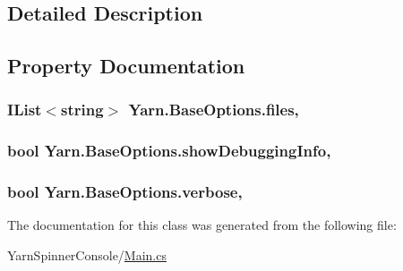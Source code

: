 \subsection{Detailed Description}


\subsection{Property Documentation}
\hypertarget{a00022_aa93cbb1bc1d5328e0a417012621e92d2}{
\subsubsection[{files}]{\setlength{\rightskip}{0pt plus 5cm}I\-List$<$string$>$ Yarn.\-Base\-Options.\-files\hspace{0.3cm}{\ttfamily [get]}, {\ttfamily [set]}}}\label{a00022_aa93cbb1bc1d5328e0a417012621e92d2}
\hypertarget{a00022_a89964ea17bd19caf00cb5bff563ed01c}{
\subsubsection[{show\-Debugging\-Info}]{\setlength{\rightskip}{0pt plus 5cm}bool Yarn.\-Base\-Options.\-show\-Debugging\-Info\hspace{0.3cm}{\ttfamily [get]}, {\ttfamily [set]}}}\label{a00022_a89964ea17bd19caf00cb5bff563ed01c}
\hypertarget{a00022_ada4d83d1756918f362d55f6649b82b17}{
\subsubsection[{verbose}]{\setlength{\rightskip}{0pt plus 5cm}bool Yarn.\-Base\-Options.\-verbose\hspace{0.3cm}{\ttfamily [get]}, {\ttfamily [set]}}}\label{a00022_ada4d83d1756918f362d55f6649b82b17}


The documentation for this class was generated from the following file\-:\begin{DoxyCompactItemize}
\item 
Yarn\-Spinner\-Console/\hyperlink{a00274}{Main.\-cs}\end{DoxyCompactItemize}
